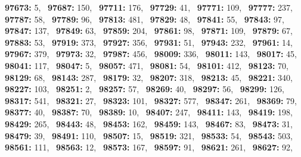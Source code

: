 \textbf{97673:} 5,\allowbreak~ 
\textbf{97687:} 150,\allowbreak~ 
\textbf{97711:} 176,\allowbreak~ 
\textbf{97729:} 41,\allowbreak~ 
\textbf{97771:} 109,\allowbreak~ 
\textbf{97777:} 237,\allowbreak~ 
\textbf{97787:} 58,\allowbreak~ 
\textbf{97789:} 96,\allowbreak~ 
\textbf{97813:} 481,\allowbreak~ 
\textbf{97829:} 48,\allowbreak~ 
\textbf{97841:} 55,\allowbreak~ 
\textbf{97843:} 97,\allowbreak~ 
\textbf{97847:} 137,\allowbreak~ 
\textbf{97849:} 63,\allowbreak~ 
\textbf{97859:} 204,\allowbreak~ 
\textbf{97861:} 98,\allowbreak~ 
\textbf{97871:} 109,\allowbreak~ 
\textbf{97879:} 67,\allowbreak~ 
\textbf{97883:} 53,\allowbreak~ 
\textbf{97919:} 373,\allowbreak~ 
\textbf{97927:} 356,\allowbreak~ 
\textbf{97931:} 51,\allowbreak~ 
\textbf{97943:} 232,\allowbreak~ 
\textbf{97961:} 14,\allowbreak~ 
\textbf{97967:} 379,\allowbreak~ 
\textbf{97973:} 32,\allowbreak~ 
\textbf{97987:} 456,\allowbreak~ 
\textbf{98009:} 336,\allowbreak~ 
\textbf{98011:} 143,\allowbreak~ 
\textbf{98017:} 45,\allowbreak~ 
\textbf{98041:} 117,\allowbreak~ 
\textbf{98047:} 5,\allowbreak~ 
\textbf{98057:} 471,\allowbreak~ 
\textbf{98081:} 54,\allowbreak~ 
\textbf{98101:} 412,\allowbreak~ 
\textbf{98123:} 70,\allowbreak~ 
\textbf{98129:} 68,\allowbreak~ 
\textbf{98143:} 287,\allowbreak~ 
\textbf{98179:} 32,\allowbreak~ 
\textbf{98207:} 318,\allowbreak~ 
\textbf{98213:} 45,\allowbreak~ 
\textbf{98221:} 340,\allowbreak~ 
\textbf{98227:} 103,\allowbreak~ 
\textbf{98251:} 2,\allowbreak~ 
\textbf{98257:} 57,\allowbreak~ 
\textbf{98269:} 40,\allowbreak~ 
\textbf{98297:} 56,\allowbreak~ 
\textbf{98299:} 126,\allowbreak~ 
\textbf{98317:} 541,\allowbreak~ 
\textbf{98321:} 27,\allowbreak~ 
\textbf{98323:} 101,\allowbreak~ 
\textbf{98327:} 577,\allowbreak~ 
\textbf{98347:} 261,\allowbreak~ 
\textbf{98369:} 79,\allowbreak~ 
\textbf{98377:} 40,\allowbreak~ 
\textbf{98387:} 70,\allowbreak~ 
\textbf{98389:} 10,\allowbreak~ 
\textbf{98407:} 247,\allowbreak~ 
\textbf{98411:} 143,\allowbreak~ 
\textbf{98419:} 198,\allowbreak~ 
\textbf{98429:} 265,\allowbreak~ 
\textbf{98443:} 48,\allowbreak~ 
\textbf{98453:} 162,\allowbreak~ 
\textbf{98459:} 143,\allowbreak~ 
\textbf{98467:} 83,\allowbreak~ 
\textbf{98473:} 31,\allowbreak~ 
\textbf{98479:} 39,\allowbreak~ 
\textbf{98491:} 110,\allowbreak~ 
\textbf{98507:} 15,\allowbreak~ 
\textbf{98519:} 321,\allowbreak~ 
\textbf{98533:} 54,\allowbreak~ 
\textbf{98543:} 503,\allowbreak~ 
\textbf{98561:} 111,\allowbreak~ 
\textbf{98563:} 12,\allowbreak~ 
\textbf{98573:} 167,\allowbreak~ 
\textbf{98597:} 91,\allowbreak~ 
\textbf{98621:} 261,\allowbreak~ 
\textbf{98627:} 92,\allowbreak~ 
